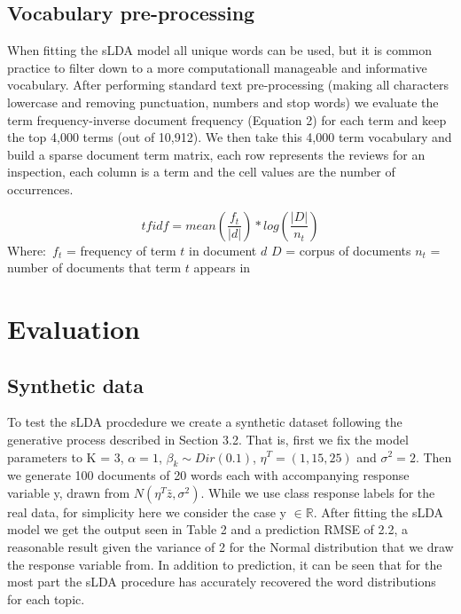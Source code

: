 \documentclass{article}
\begin{document}
\normalsize

\subsection{Vocabulary pre-processing}
When fitting the sLDA model all unique words can be used, but it is common practice to filter down to a more computationall 
manageable and informative vocabulary. After performing standard text pre-processing (making all characters lowercase and 
removing punctuation, numbers and stop words) we evaluate the term frequency-inverse document frequency (Equation 2) for each term and keep the top 4,000 terms (out of 10,912). We then take this 4,000 term vocabulary and build a 
sparse document term matrix, each row represents the reviews for an inspection, each column is a term and the cell values are 
the number of occurrences.

\begin{equation}
tfidf = mean(\frac{f_{t}}{|d|})*log(\frac{|D|}{n_{t}}) \label{eq:tfidf}
\end{equation}
Where$\colon$ \newline
$f_{t}$ = frequency of term $t$ in document $d$ \newline
$D$ = corpus of documents \newline
$n_{t}$ = number of documents that term $t$ appears in \newline

\section{Evaluation}

\subsection{Synthetic data}
To test the sLDA procdedure we create a synthetic dataset following the generative process described in Section 3.2. That is, 
first we fix the model parameters to K = 3, $\alpha = 1$, $\beta_{k} \sim Dir(0.1)$, $\eta^{T} = (1, 15, 25)$ and $\sigma^{2} 
= 2$. Then we generate 100 documents of 20 words each with accompanying response variable y, drawn from  $N(\eta^{T}\bar{z}
,\sigma^{2})$. While we use class response labels for the real data, for simplicity here we consider the case y $\in \mathbb{R
}$. After fitting the sLDA model we get the output seen in Table 2 and a prediction RMSE of 2.2, a 
reasonable result given the variance of 2 for the Normal distribution that we draw the response variable from. In addition to 
prediction, it can be seen that for the most part the sLDA procedure has accurately recovered the word distributions for
each topic.
\end{document}

